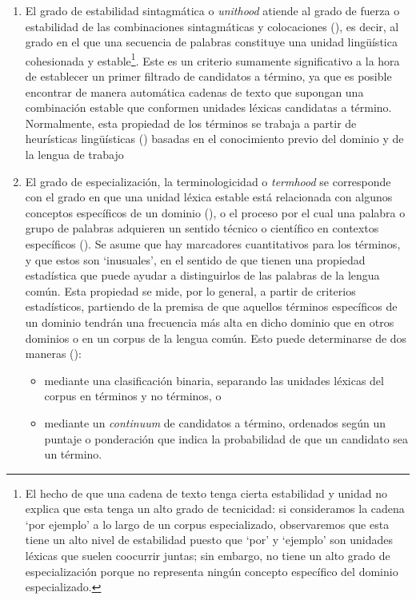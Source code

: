\begin{enumerate}[label=(\arabic*)]
    \item El grado de estabilidad sintagmática o \emph{unithood} atiende al grado de fuerza o estabilidad de las combinaciones sintagmáticas y colocaciones (\cite{kageura1996}), es decir, al grado en el que una secuencia de palabras constituye una unidad lingüística cohesionada y estable\footnote{El hecho de que una cadena de texto tenga cierta estabilidad y unidad no explica que esta tenga un alto grado de tecnicidad: si consideramos la cadena ‘por ejemplo’ a lo largo de un corpus especializado, observaremos que esta tiene un alto nivel de estabilidad puesto que ‘por’ y ‘ejemplo’ son unidades léxicas que suelen coocurrir juntas; sin embargo, no tiene un alto grado de especialización porque no representa ningún concepto específico del dominio especializado.}. Este es un criterio sumamente significativo a la hora de establecer un primer filtrado de candidatos a término, ya que es posible encontrar de manera automática cadenas de texto que supongan una combinación estable que conformen unidades léxicas candidatas a término. Normalmente, esta propiedad de los términos se trabaja a partir de heurísticas lingüísticas (\cite{acosta2015reconocimiento}) basadas en el conocimiento previo del dominio y de la lengua de trabajo
    \item El grado de especialización, la terminologicidad o \emph{termhood} se corresponde con el grado en que una unidad léxica estable está relacionada con algunos conceptos específicos de un dominio (\cite{kageura1996methods}), o el proceso por el cual una palabra o grupo de palabras adquieren un sentido técnico o científico en contextos específicos (\cite{depecker2003saussure}). Se asume que hay marcadores cuantitativos para los términos, y que estos son ‘inusuales’, en el sentido de que tienen una propiedad estadística que puede ayudar a distinguirlos de las palabras de la lengua común. Esta propiedad se mide, por lo general, a partir de criterios estadísticos, partiendo de la premisa de que aquellos términos específicos de un dominio tendrán una frecuencia más alta en dicho dominio que en otros dominios o en un corpus de la lengua común. Esto puede determinarse de dos maneras (\cite{nazar2016distributional}):
        \begin{itemize}
            \item mediante una clasificación binaria, separando las unidades léxicas del corpus en términos y no términos, o
            \item mediante un \textit{continuum} de candidatos a término, ordenados según un puntaje o ponderación que indica la probabilidad de que un candidato sea un término.
        \end{itemize}


\end{enumerate}
